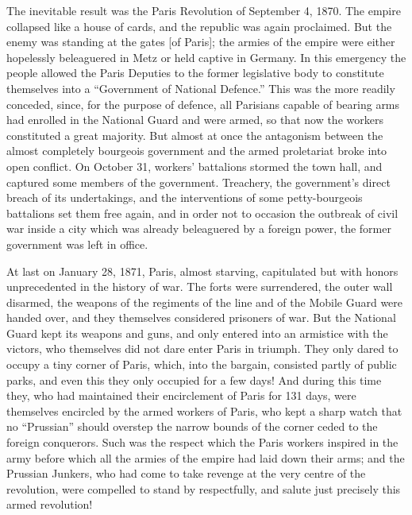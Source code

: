 \documentclass{article}
\begin{document}
The inevitable result was the Paris Revolution of September 4, 1870. The
empire collapsed like a house of cards, and the republic was again
proclaimed. But the enemy was standing at the gates [of Paris]; the armies
of the empire were either hopelessly beleaguered in Metz or held captive
in Germany. In this emergency the people allowed the Paris Deputies to the
former legislative body to constitute themselves into a “Government of
National Defence.” This was the more readily conceded, since, for the
purpose of defence, all Parisians capable of bearing arms had enrolled in
the National Guard and were armed, so that now the workers constituted
a great majority. But almost at once the antagonism between the almost
completely bourgeois government and the armed proletariat broke into open
conflict. On October 31, workers’ battalions stormed the town hall, and
captured some members of the government. Treachery, the government’s
direct breach of its undertakings, and the interventions of some
petty-bourgeois battalions set them free again, and in order not to
occasion the outbreak of civil war inside a city which was already
beleaguered by a foreign power, the former government was left in office.

At last on January 28, 1871, Paris, almost starving, capitulated but with
honors unprecedented in the history of war. The forts were surrendered,
the outer wall disarmed, the weapons of the regiments of the line and of
the Mobile Guard were handed over, and they themselves considered
prisoners of war. But the National Guard kept its weapons and guns, and
only entered into an armistice with the victors, who themselves did not
dare enter Paris in triumph. They only dared to occupy a tiny corner of
Paris, which, into the bargain, consisted partly of public parks, and even
this they only occupied for a few days! And during this time they, who had
maintained their encirclement of Paris for 131 days, were themselves
encircled by the armed workers of Paris, who kept a sharp watch that no
“Prussian” should overstep the narrow bounds of the corner ceded to the
foreign conquerors. Such was the respect which the Paris workers inspired
in the army before which all the armies of the empire had laid down their
arms; and the Prussian Junkers, who had come to take revenge at the very
centre of the revolution, were compelled to stand by respectfully, and
salute just precisely this armed revolution!
\end{document}
